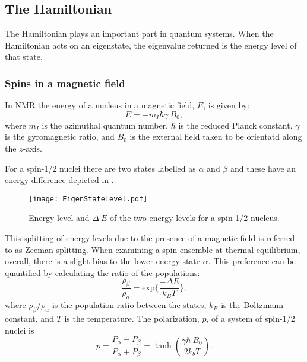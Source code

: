 \subsection{The Hamiltonian}\label{Hamiltonian}

The Hamiltonian plays an important part in quantum systems. When the Hamiltonian acts on an eigenstate,
the eigenvalue returned is the energy level of that state.

\subsubsection{Spins in a magnetic field}\label{EnergyLevels}

In NMR the energy of a nucleus in a magnetic field, $E$, is given by:
\begin{equation}
  E = -m_I\hbar\gamma~B_0,
\end{equation}
where $m_I$ is the azimuthal quantum number, $\hbar$ is the reduced Planck constant, $\gamma$
is the gyromagnetic ratio, and $B_0$ is the external field taken to be orientatd along the $z$-axis.

For a spin-1/2 nuclei there are two states labelled as $\alpha$ and $\beta$
and these have an energy difference depicted in .

\begin{figure}[h]
  \begin{center}
  \texttt{[image: EigenStateLevel.pdf]}
  \end{center}
  \caption{Energy level and $\Delta~E$ of the two energy levels for a spin-1/2 nucleus.}
  \label{fig:EnergySplit}
\end{figure}

This splitting of energy levels due to the presence of a magnetic field is referred to as Zeeman splitting.
When examining a spin ensemble at thermal equilibrium, overall, there is a slight bias to the lower energy
state $\alpha$. This preference can be quantified by calculating the ratio of the populations:
\begin{equation}\label{eqn:Boltzmann}
  \frac{\rho_{\beta}}{\rho_{\alpha}} = \text{exp}\{\frac{-\Delta{E}}{k_B T}\},
\end{equation}
where $\rho_{\beta}/\rho_{\alpha}$ is the population ratio between the states, $k_B$ is the Boltzmann constant, and $T$ is the temperature. The polarization, $p$, of a system of
spin-1/2 nuclei is
\begin{equation}\label{eqn:Polarization}
  p = \frac{P_\alpha - P_\beta}{P_\alpha + P_\beta} = \tanh(\frac{\gamma\hbar~B_0}{2k_bT}).
\end{equation}


